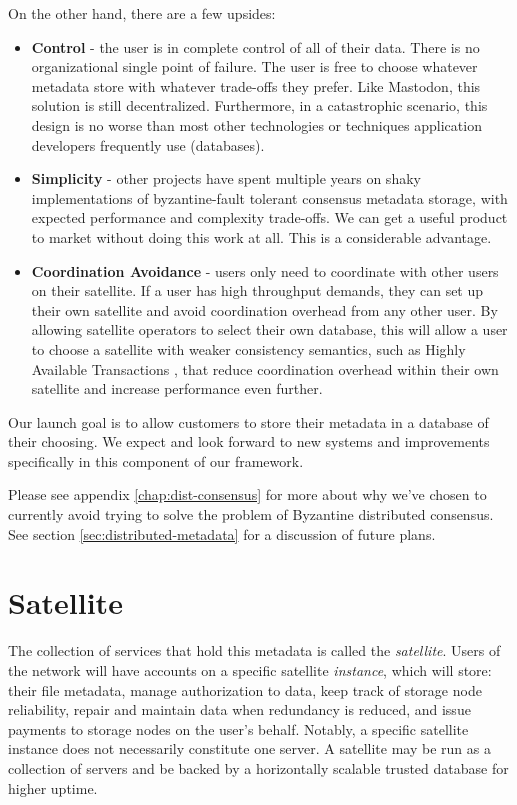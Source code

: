 \documentclass[11pt,fleqn,openany]{book}
\begin{document}
On the other hand, there are a few upsides:
\begin{itemize}
\item {\bf Control} - the user is in complete control of all of their data.
  There is no organizational single point of failure. The user is free
  to choose whatever metadata store with whatever trade-offs they prefer. Like
  Mastodon\cite{mastodon}, this solution is still decentralized. Furthermore, in a
  catastrophic scenario, this design is no worse than most other technologies or
  techniques application developers frequently use (databases).
\item {\bf Simplicity} - other projects have spent multiple years on shaky
  implementations of byzantine-fault tolerant consensus metadata storage,
  with expected performance and complexity trade-offs.
  We can get a useful product to market without doing this work at all.
  This is a considerable advantage.
\item {\bf Coordination Avoidance} - users only need to coordinate with
  other users on their satellite. If a user has high throughput demands,
  they can set up their own satellite and avoid coordination overhead from
  any other user. By allowing satellite operators to select their own database,
  this will allow a user to choose a satellite with weaker consistency
  semantics, such as Highly Available Transactions \cite{hat}, that reduce
  coordination overhead within their own satellite and increase performance
  even further.
\end{itemize}

Our launch goal is to allow customers to store their metadata in a database of
their choosing. We expect and look forward to new systems and improvements
specifically in this component of our framework.

Please see appendix \ref{chap:dist-consensus} for more about why we've chosen
to currently avoid trying to solve the problem of Byzantine distributed consensus.
See section \ref{sec:distributed-metadata} for a discussion of future plans.

\section{Satellite}

The collection of services that hold this metadata is called the
{\em satellite}. Users of the network will have accounts on a specific
satellite {\em instance}, which will store: their file metadata, manage authorization
to data, keep track of storage node reliability, repair and maintain data when
redundancy is reduced, and issue payments to storage nodes on the user's behalf.
Notably, a specific satellite instance does not necessarily constitute one
server. A satellite may be run as a collection of servers and be backed by
a horizontally scalable trusted database for higher uptime.
\end{document}
